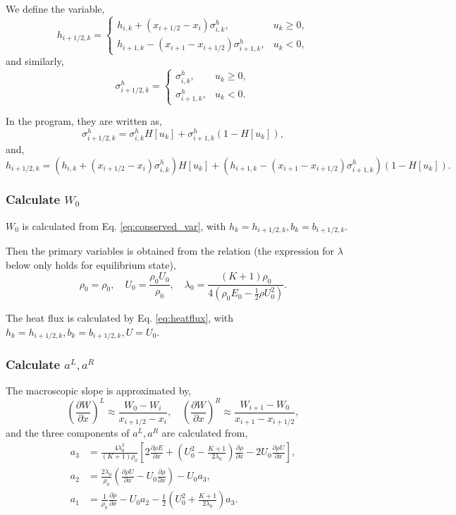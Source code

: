 \documentclass[a4paper]{book}
\begin{document}
We define the variable,
$$
h_{i+1/2,k} = 
\begin{cases} 
h_{i,k}+(x_{i+1/2}-x_i)\sigma_{i,k}^h, & u_k \geqslant 0,\\ 
h_{i+1,k}-(x_{i+1}-x_{i+1/2})\sigma_{i+1,k}^h, & u_k < 0,
\end{cases}
$$
and similarly,
$$
\sigma_{i+1/2,k}^h = 
\begin{cases} 
\sigma_{i,k}^h, & u_k \geqslant 0,\\ 
\sigma_{i+1,k}^h, & u_k < 0.
\end{cases}
$$

In the program, they are written as,
$$\sigma_{i+1/2,k}^h =\sigma_{i,k}^h H[u_k]+\sigma_{i+1,k}^h(1-H[u_k]),$$
and,
$$h_{i+1/2,k} = (h_{i,k}+(x_{i+1/2}-x_i)\sigma_{i,k}^h)H[u_k]+(h_{i+1,k}-(x_{i+1}-x_{i+1/2})\sigma_{i+1,k}^h)(1-H[u_k]).$$

\subsubsection*{Calculate $W_0$}
$W_0$ is calculated from Eq. \ref{eq:conserved_var}, with $h_k=h_{i+1/2,k}, b_k=b_{i+1/2,k}$.

Then the primary variables is obtained from the relation (the expression for $\lambda$ below only holds for equilibrium state),
$$\rho_0 = \rho_0,\quad U_0=\frac{\rho_0 U_0}{\rho_0},\quad \lambda_0=\frac{(K+1)\rho_0}{4\left(\rho_0 E_0-\frac{1}{2}\rho U_0^2\right)}.$$

The heat flux is calculated by Eq. \ref{eq:heatflux}, with $h_k=h_{i+1/2,k},b_k=b_{i+1/2,k},U=U_0$.

\subsubsection*{Calculate $a^L,a^R$}
The macroscopic slope is approximated by,
$$\left(\frac{\partial W}{\partial x}\right)^L\approx\frac{W_0-W_{i}}{x_{i+1/2}-x_i},\quad \left(\frac{\partial W}{\partial x}\right)^R\approx\frac{W_{i+1}-W_{0}}{x_{i+1}-x_{i+1/2}},$$
and the three components of $a^L,a^R$ are calculated from,
\begin{equation} 
    \label{eq:micro_slope}
    \begin{aligned}
        a_3&=\frac{4\lambda_0^2}{(K+1)\rho_0}\left[2\frac{\partial\rho E}{\partial x}+\left(U_0^2-\frac{K+1}{2\lambda_0}\right)\frac{\partial\rho}{\partial x}-2U_0\frac{\partial\rho U}{\partial x}\right],\\
        a_2&=\frac{2\lambda_0}{\rho_0}\left(\frac{\partial\rho U}{\partial x}-U_0\frac{\partial\rho}{\partial x}\right)-U_0a_3,\\
        a_1&=\frac{1}{\rho_0}\frac{\partial\rho}{\partial x}-U_0a_2-\frac{1}{2}\left(U_0^2+\frac{K+1}{2\lambda_0}\right)a_3.
    \end{aligned}
\end{equation}
\end{document}
